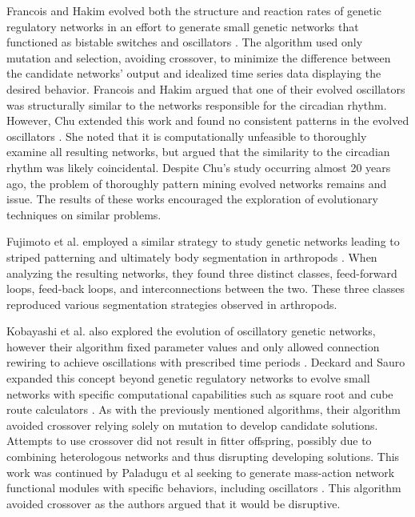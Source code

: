 \documentclass[12pt]{report}
\begin{document}
Francois and Hakim evolved both the structure and reaction rates of genetic regulatory networks in an effort to generate small genetic networks that functioned as bistable switches and oscillators \cite{francois_hakim_2004}. The  algorithm used only mutation and selection, avoiding crossover, to minimize the difference between the candidate networks' output and idealized time series data displaying the desired behavior. Francois and Hakim argued that one of their evolved oscillators was structurally similar to the networks responsible for the circadian rhythm. However, Chu extended this work and found no consistent patterns in the evolved oscillators \cite{Chu_oscillator}. She noted that it is computationally unfeasible to thoroughly examine all resulting networks, but argued that the similarity to the circadian rhythm was likely coincidental. Despite Chu's study occurring almost 20 years ago, the problem of thoroughly pattern mining evolved networks remains and issue. The results of these works encouraged the exploration of evolutionary techniques on similar problems.

Fujimoto et al. employed a similar strategy to study genetic networks leading to striped patterning and ultimately body segmentation in arthropods \cite{fujimoto_network_2008}. When analyzing the resulting networks, they found three distinct classes, feed-forward loops, feed-back loops, and interconnections between the two. These three classes reproduced various segmentation strategies observed in arthropods.

Kobayashi et al. also explored the evolution of oscillatory genetic networks, however their algorithm fixed parameter values and only allowed connection rewiring to achieve oscillations with prescribed time periods \cite{kobayashi_evolutionary_2010}. Deckard and Sauro expanded this concept beyond genetic regulatory networks to evolve small networks with specific computational capabilities such as square root and cube route calculators \cite{deckard_preliminary_2004}. As with the previously mentioned algorithms, their algorithm avoided crossover relying solely on mutation to develop candidate solutions. Attempts to use crossover did not result in fitter offspring, possibly due to combining heterologous networks and thus disrupting developing solutions. This work was continued by Paladugu et al seeking to generate mass-action network functional modules with specific behaviors, including oscillators \cite{Paladugu2006}.  This algorithm avoided crossover as the authors argued that it would be disruptive.
\end{document}
